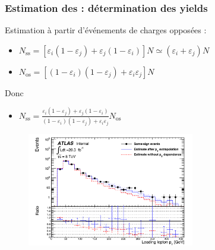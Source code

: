 \begin{frame}
\frametitle{Estimation des  : détermination des yields}
\begin{maliste}
\item Estimation à partir d'événements de charges opposées :
\begin{itemize}
\item $N_{\text{ss}} = \left[\varepsilon_i(1-\varepsilon_j) + \varepsilon_j(1-\varepsilon_i)\right]N \simeq \left(\varepsilon_i+\varepsilon_j\right)N$
\item $N_{\text{os}} = \left[\left(1-\varepsilon_i\right)\left(1-\varepsilon_j\right)+\varepsilon_i\varepsilon_j\right]N$
\end{itemize}
Donc
\begin{itemize}
\item $N_{\text{ss}} = \frac{\varepsilon_i(1-\varepsilon_j) + \varepsilon_j(1-\varepsilon_i)}{\left(1-\varepsilon_i\right)\left(1-\varepsilon_j\right)+\varepsilon_i\varepsilon_j}N_{\text{os}}$
\end{itemize}
\end{maliste}

\begin{figure}[p]
  \begin{center}
    \includegraphics[width=0.65\textwidth]{Figures/QMisId/ClosureDataPtR.pdf}
  \end{center}
\end{figure}
\end{frame}


